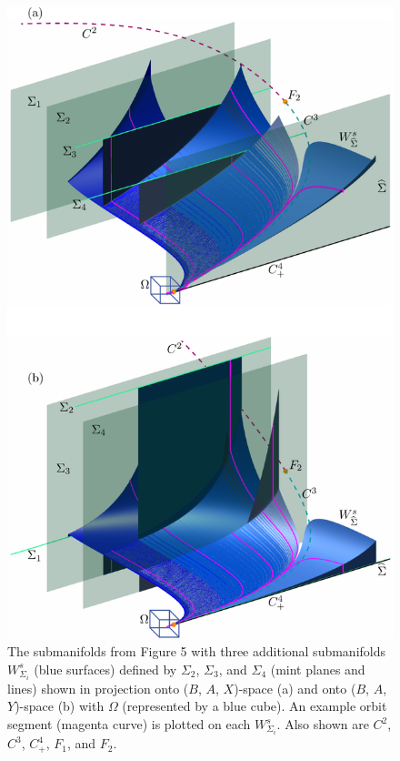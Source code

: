 \documentclass{ws-ijbc}
\begin{document}
\begin{figure}[H]
\centering
\includegraphics[]{./figures/MKMO_6.pdf}
\caption{The submanifolds from Figure 5 with three additional submanifolds $W^s_{\Sigma_i}$ (blue surfaces) defined by $\Sigma_2$, $\Sigma_3$, and $\Sigma_4$ (mint planes and lines) shown in projection onto ($B$, $A$, $X$)-space (a) and onto ($B$, $A$, $Y$)-space (b) with $\Omega$ (represented by a blue cube).  An example orbit segment (magenta curve) is plotted on each $W^s_{\Sigma_i}$.  Also shown are $C^2$, $C^3$, $C^4_+$, $F_1$, and $F_2$.}
\label{figure_6}
\end{figure}
\end{document}
